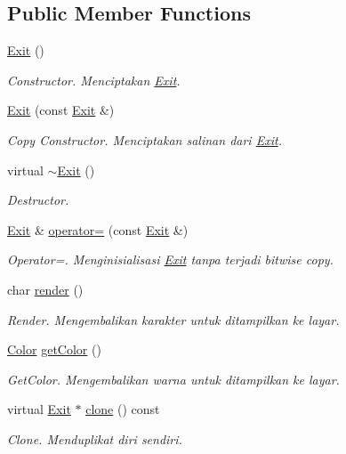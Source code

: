 \subsection*{Public Member Functions}
\begin{DoxyCompactItemize}
\item 
\hyperlink{classExit_a9b2f58ee65af58d03d7004d9fc2ab264}{Exit} ()
\begin{DoxyCompactList}\small\item\em Constructor. Menciptakan \hyperlink{classExit}{Exit}. \end{DoxyCompactList}\item 
\hyperlink{classExit_a4cdd044013db87741ebc0abdabd84a16}{Exit} (const \hyperlink{classExit}{Exit} \&)
\begin{DoxyCompactList}\small\item\em Copy Constructor. Menciptakan salinan dari \hyperlink{classExit}{Exit}. \end{DoxyCompactList}\item 
virtual \hyperlink{classExit_adf66e70ca988ae2fe7e74ef256d8612a}{$\sim$\+Exit} ()
\begin{DoxyCompactList}\small\item\em Destructor. \end{DoxyCompactList}\item 
\hyperlink{classExit}{Exit} \& \hyperlink{classExit_a0267879724d7267cc38a44c97828e6eb}{operator=} (const \hyperlink{classExit}{Exit} \&)
\begin{DoxyCompactList}\small\item\em Operator=. Menginisialisasi \hyperlink{classExit}{Exit} tanpa terjadi bitwise copy. \end{DoxyCompactList}\item 
char \hyperlink{classExit_aa02d10be39e89bb4f7d7f2934829863a}{render} ()
\begin{DoxyCompactList}\small\item\em Render. Mengembalikan karakter untuk ditampilkan ke layar. \end{DoxyCompactList}\item 
\hyperlink{color_8h_ab87bacfdad76e61b9412d7124be44c1c}{Color} \hyperlink{classExit_a8a409166c560f8b72b876e3d9711769a}{get\+Color} ()
\begin{DoxyCompactList}\small\item\em Get\+Color. Mengembalikan warna untuk ditampilkan ke layar. \end{DoxyCompactList}\item 
virtual \hyperlink{classExit}{Exit} $\ast$ \hyperlink{classExit_a01a14491e2f7148b0e03b4297c60a0a0}{clone} () const 
\begin{DoxyCompactList}\small\item\em Clone. Menduplikat diri sendiri. \end{DoxyCompactList}\end{DoxyCompactItemize}
